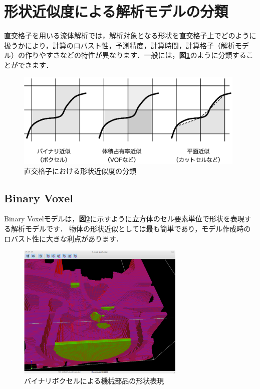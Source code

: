 
\graphicspath{{./fig_Model/}}

%
\section{形状近似度による解析モデルの分類}
\label{sec:classification of model}
直交格子を用いる流体解析では，解析対象となる形状を直交格子上でどのように扱うかにより，計算のロバスト性，予測精度，計算時間，計算格子（解析モデル）の作りやすさなどの特性が異なります．一般には，\textbf{図\ref{fig:class model}}のように分類することができます\cite{CFDhandbook:03}．

\begin{figure}[htdp]
\begin{center}
\includegraphics[width=11cm,clip]{classification.eps}
\caption{直交格子における形状近似度の分類}
\label{fig:class model}
\end{center}
\end{figure}

%
\subsection{Binary Voxel}
Binary Voxelモデルは，\textbf{図\ref{fig:Eport binary voxel}}に示すように立方体のセル要素単位で形状を表現する解析モデルです．
物体の形状近似としては最も簡単であり，モデル作成時のロバスト性に大きな利点があります．

\begin{figure}[htbp]
\begin{center}
\includegraphics[width=8cm,clip]{eport.eps}
\end{center}
\caption{バイナリボクセルによる機械部品の形状表現}
\label{fig:Eport binary voxel}
\end{figure}

